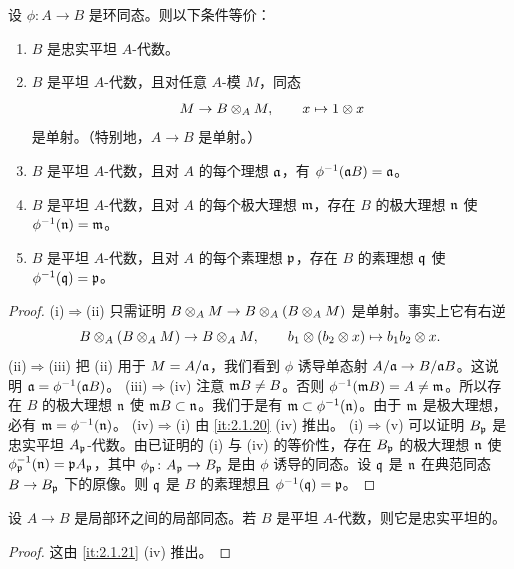 \begin{proposition}\label{it:2.1.21}
设 $\phi\colon A\to B$ 是环同态。则以下条件等价：
\begin{enumerate}[label=(\roman*),leftmargin=2.4em]
  \item $B$ 是忠实平坦 $A$-代数。
  \item $B$ 是平坦 $A$-代数，且对任意 $A$-模 $M$，同态
  \[
  M\to B\otimes_AM,\qquad x\mapsto1\otimes x
  \]
  是单射。（特别地，$A\to B$ 是单射。）
  \item $B$ 是平坦 $A$-代数，且对 $A$ 的每个理想 $\mathfrak{a}$，有 $\phi^{-1}(\mathfrak{a} B)=\mathfrak{a}$。
  \item $B$ 是平坦 $A$-代数，且对 $A$ 的每个极大理想 $\mathfrak{m}$，存在 $B$ 的极大理想 $\mathfrak{n}$ 使 $\phi^{-1}(\mathfrak{n})=\mathfrak{m}$。
  \item $B$ 是平坦 $A$-代数，且对 $A$ 的每个素理想 $\mathfrak{p}$，存在 $B$ 的素理想 $\mathfrak{q}$ 使 $\phi^{-1}(\mathfrak{q})=\mathfrak{p}$。
\end{enumerate}
\end{proposition}
\begin{proof}
(i)$\Rightarrow$(ii) 只需证明 $B\otimes_AM\to B\otimes_A(B\otimes_AM)$ 是单射。事实上它有右逆
\[
B\otimes_A(B\otimes_AM)\to B\otimes_AM,\qquad b_1\otimes(b_2\otimes x)\mapsto b_1b_2\otimes x.
\]
(ii)$\Rightarrow$(iii) 把 (ii) 用于 $M=A/\mathfrak{a}$，我们看到 $\phi$ 诱导单态射 $A/\mathfrak{a}\to B/\mathfrak{a} B$。这说明 $\mathfrak{a}=\phi^{-1}(\mathfrak{a} B)$。
(iii)$\Rightarrow$(iv) 注意 $\mathfrak{m} B\ne B$。否则 $\phi^{-1}(\mathfrak{m} B)=A\ne\mathfrak{m}$。所以存在 $B$ 的极大理想 $\mathfrak{n}$ 使 $\mathfrak{m} B\subset\mathfrak{n}$。我们于是有 $\mathfrak{m}\subset\phi^{-1}(\mathfrak{n})$。由于 $\mathfrak{m}$ 是极大理想，必有 $\mathfrak{m}=\phi^{-1}(\mathfrak{n})$。
(iv)$\Rightarrow$(i) 由 \ref{it:2.1.20} (iv) 推出。
(i)$\Rightarrow$(v) 可以证明 $B_{\mathfrak{p}}$ 是忠实平坦 $A_{\mathfrak{p}}$-代数。由已证明的 (i) 与 (iv) 的等价性，存在 $B_{\mathfrak{p}}$ 的极大理想 $\mathfrak{n}$ 使 $\phi_{\mathfrak{p}}^{-1}(\mathfrak{n})=\mathfrak{p} A_{\mathfrak{p}}$，其中 $\phi_{\mathfrak{p}}\colon A_{\mathfrak{p}}\to B_{\mathfrak{p}}$ 是由 $\phi$ 诱导的同态。设 $\mathfrak{q}$ 是 $\mathfrak{n}$ 在典范同态 $B\to B_{\mathfrak{p}}$ 下的原像。则 $\mathfrak{q}$ 是 $B$ 的素理想且 $\phi^{-1}(\mathfrak{q})=\mathfrak{p}$。
\end{proof}

\begin{corollary}\label{it:2.1.22}
设 $A\to B$ 是局部环之间的局部同态。若 $B$ 是平坦 $A$-代数，则它是忠实平坦的。
\end{corollary}
\begin{proof}
这由 \ref{it:2.1.21} (iv) 推出。
\end{proof}

